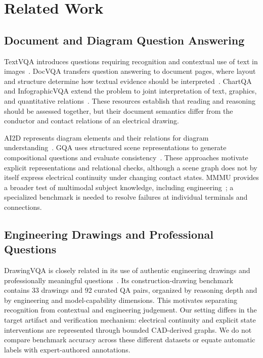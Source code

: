\section{Related Work}\label{sec:related}
\subsection{Document and Diagram Question Answering}
TextVQA introduces questions requiring recognition and contextual use of text in images~\cite{singh2019textvqa}. DocVQA transfers question answering to document pages, where layout and structure determine how textual evidence should be interpreted~\cite{mathew2021docvqa}. ChartQA and InfographicVQA extend the problem to joint interpretation of text, graphics, and quantitative relations~\cite{masry2022chartqa,mathew2022infographic}. These resources establish that reading and reasoning should be assessed together, but their document semantics differ from the conductor and contact relations of an electrical drawing.

AI2D represents diagram elements and their relations for diagram understanding~\cite{kembhavi2016diagram}. GQA uses structured scene representations to generate compositional questions and evaluate consistency~\cite{hudson2019gqa}. These approaches motivate explicit representations and relational checks, although a scene graph does not by itself express electrical continuity under changing contact states. MMMU provides a broader test of multimodal subject knowledge, including engineering~\cite{yue2024mmmu}; a specialized benchmark is needed to resolve failures at individual terminals and connections.

\subsection{Engineering Drawings and Professional Questions}
DrawingVQA is closely related in its use of authentic engineering drawings and professionally meaningful questions~\cite{jung2026drawingvqa}. Its construction-drawing benchmark contains 33 drawings and 92 curated QA pairs, organized by reasoning depth and by engineering and model-capability dimensions. This motivates separating recognition from contextual and engineering judgement. Our setting differs in the target artifact and verification mechanism: electrical continuity and explicit state interventions are represented through bounded CAD-derived graphs. We do not compare benchmark accuracy across these different datasets or equate automatic labels with expert-authored annotations.

